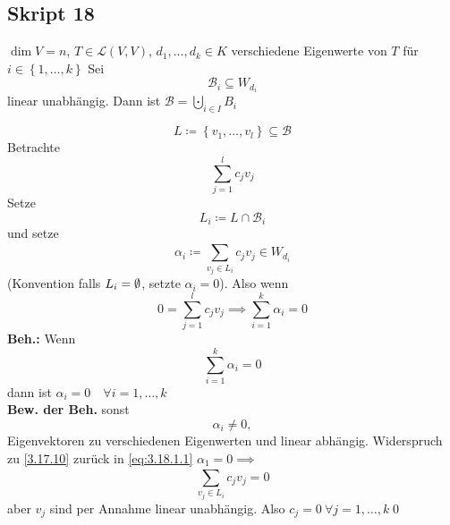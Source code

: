 \subsection{Skript 18}
\begin{subcorollary}
$ \dim V = n $, $ T \in \mathcal{L} \left( V, V \right)  $, $ d_1, \dotsc, d_k \in K $ verschiedene Eigenwerte von $ T $ für $ i \in \left\{ 1, \dotsc, k \right\}  $ 
Sei
\[
	\mathcal{B} _i \subseteq W_{d_i} 
\]
linear unabhängig.
Dann ist $ \mathcal{B} = \bigcupdot_{i \in  I} B_i $
\end{subcorollary}
\begin{subproof*}
	\[
		L \coloneqq  \left\{ v_1, \dotsc, v_l \right\} \subseteq \mathcal{B} 
	\]
	Betrachte
	\[
		\sum_{j=1}^{l} c_j v_j
	\]
	Setze
	\[
		L_i \coloneqq  L \cap \mathcal{B} _i
	\]
	und setze
	\begin{equation}
		\label{eq:3.18.1.1}
		\tag{$ * $}
		\alpha_i \coloneqq \sum_{v_j \in L_i}^{} c_j v_j \in W_{d_i} 
	\end{equation}
	(Konvention falls $ L_i = \emptyset  $, setzte $ \alpha_i = 0 $).
	Also wenn
	\[
		0 = \sum_{j=1}^{l} c_j v_j \implies \sum_{i=1}^{k} \alpha_i = 0
	\]
	\textbf{Beh.:}
	Wenn 
	\[
		\sum_{i=1}^{k} \alpha_i = 0
	\]
	dann ist $ \alpha_i = 0 \quad \forall i = 1, \dotsc, k $\\
	\textbf{Bew. der Beh.} sonst
	\[
		\alpha_i \neq 0,
	\]
	Eigenvektoren zu verschiedenen Eigenwerten und linear abhängig.
	Widerspruch zu \ref{3.17.10} zurück in \eqref{eq:3.18.1.1} $ \alpha_1 = 0 \implies  $ 
	\[
		\sum_{v_j \in L_i}^{} c_j v_j = 0
	\]
	aber $ v_j $ sind per Annahme linear unabhängig.
	Also $ c_j = 0 ~ \forall j = 1, \dotsc, k $\qed
\end{subproof*}

